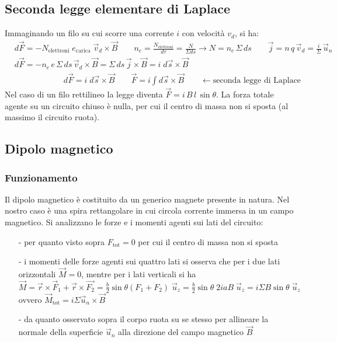 \documentclass[a4paper]{article}
\newcommand\uz{\vec{u}_z}
\newcommand\un{\vec{u}_n}
\begin{document}
\subsection{Seconda legge elementare di Laplace}
Immaginando un filo su cui scorre una corrente \(i\) con velocità \(v_d\), si ha:
\begin{align*}
	& d\vec{F} = - N_\text{elettroni} \; e_\text{carica} \; \vec{v}_d \times \vec{B} \qquad n_e = \frac{N_\text{elettroni}}{d\tau} = \frac{N}{\Sigma ds} \rightarrow N = n_e \, \Sigma \, ds \qquad \vec{j} = n \, q \, \vec{v}_d = \frac{i}{\Sigma} \, \un \\
	& d\vec{F} = - n_e \, e \, \Sigma \, ds \, \vec{v}_d \times \vec{B} = \Sigma \, ds \, \vec{j} \times \vec{B} = i \; d\vec{s} \times \vec{B} \\
	&\qquad\qquad\qquad d\vec{F} = i \; d\vec{s} \times \vec{B} \qquad \vec{F} = i \int d\vec{s} \times \vec{B} \qquad \leftarrow \text{seconda legge di Laplace}
\end{align*}
Nel caso di un filo rettilineo la legge diventa \(\vec{F} = i \, B \, l \, \sin \theta\). La forza totale agente su un circuito
chiuso è nulla, per cui il centro di massa non si sposta (al massimo il circuito ruota).

\subsection{Dipolo magnetico}
\subsubsection*{Funzionamento}
Il dipolo magnetico è costituito da un generico magnete presente in natura. Nel nostro caso è una spira rettangolare in cui circola
corrente immersa in un campo magnetico. Si analizzano le forze e i momenti agenti sui lati del circuito:
\begin{itemize}[topsep=3pt, itemsep=0pt]
	\item[-] per quanto visto sopra \(F_\text{tot} = 0\) per cui il centro di massa non si sposta
	\item[-] i momenti delle forze agenti sui quattro lati si osserva che per i due lati orizzontali \(\vec{M} = 0\), mentre per i
	lati verticali si ha \(\vec{M} = \vec{r} \times \vec{F}_1 + \vec{r} \times \vec{F_2} = \frac{b}{2} \sin \theta (F_1 + F_2) \; \uz = \frac{b}{2} \sin \theta \; 2 i a B \; \uz = i \Sigma B \sin \theta \; \uz\)
	ovvero \(\vec{M}_\text{tot} = i \Sigma \un \times \vec{B}\)
	\item[-] da quanto osservato sopra il corpo ruota su se stesso per allineare la normale della superficie \(\un\) alla direzione
	del campo magnetico \(\vec{B}\)
\end{itemize}
\end{document}
